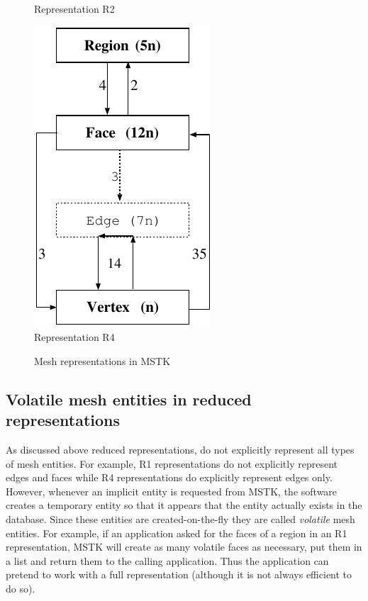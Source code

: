 \documentclass[12pt]{article}
\begin{document}
\begin{figure}[!ht]
\begin{center}
\begin{minipage}{1.75in}
\begin{center}
        Representation R2
      \end{center}
    \end{minipage}
    \begin{minipage}{1.75in}
      \begin{center}
        \includegraphics[scale=0.9]{figures/repR4} \\
        Representation R4
      \end{center}
    \end{minipage}
  \end{center}
  \caption{Mesh representations in MSTK}
  \label{fig:reptypes}
\end{figure}

\subsection{Volatile mesh entities in reduced representations}

As discussed above reduced representations, do not explicitly
represent all types of mesh entities. For example, R1 representations
do not explicitly represent edges and faces while R4 representations
do explicitly represent edges only. However, whenever an implicit
entity is requested from MSTK, the software creates a temporary entity
so that it appears that the entity actually exists in the
database. Since these entities are created-on-the-fly they are called
{\em volatile} mesh entities. For example, if an application asked for
the faces of a region in an R1 representation, MSTK will create as
many volatile faces as necessary, put them in a list and return them
to the calling application. Thus the application can pretend to work
with a full representation (although it is not always efficient to do so).
\end{document}
